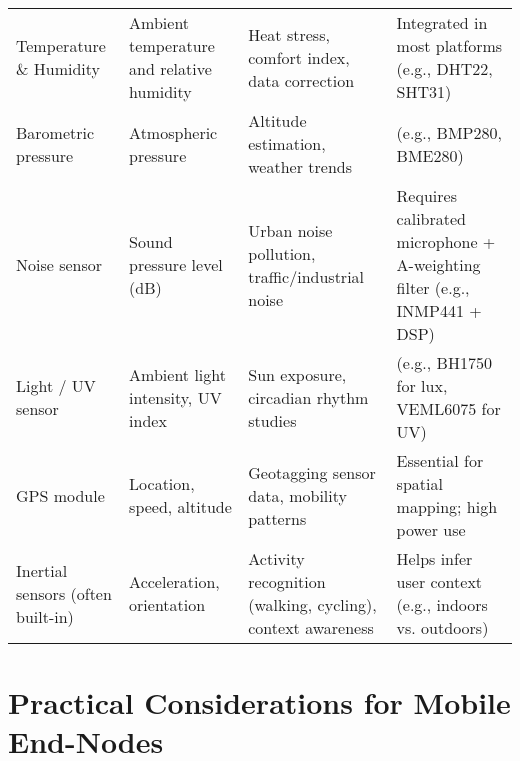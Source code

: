 \documentclass[12pt,a4paper]{article}
\begin{document}
\begin{longtable}{>{\RaggedRight}p{3.5cm}>{\RaggedRight}p{2.8cm}>{\RaggedRight}p{4.5cm}>{\RaggedRight}p{4.5cm}}
    Temperature \& Humidity                             & Ambient temperature and relative humidity                   & Heat stress, comfort index, data correction                & Integrated in most platforms (e.g., DHT22, SHT31)                                    \\

    Barometric pressure                                 & Atmospheric pressure                                        & Altitude estimation, weather trends                        & (e.g., BMP280, BME280)                                                               \\

    \addlinespace
    Noise sensor                                        & Sound pressure level (dB)                                   & Urban noise pollution, traffic/industrial noise            & Requires calibrated microphone + A-weighting filter (e.g., INMP441 + DSP)            \\

    Light / UV sensor                                   & Ambient light intensity, UV index                           & Sun exposure, circadian rhythm studies                     & (e.g., BH1750 for lux, VEML6075 for UV)                                              \\

    GPS module                                          & Location, speed, altitude                                   & Geotagging sensor data, mobility patterns                  & Essential for spatial mapping; high power use                                        \\

    Inertial sensors (often built-in)                   & Acceleration, orientation                                   & Activity recognition (walking, cycling), context awareness & Helps infer user context (e.g., indoors vs. outdoors)                                \\
\end{longtable}

\section*{Practical Considerations for Mobile End-Nodes}
\end{document}
